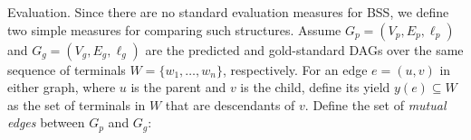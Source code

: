 \documentclass[11pt,letterpaper]{article}
\makeatletter
\renewcommand{\paragraph}{
  \@startsection{paragraph}{4}
  {\z@}{.3ex \@plus .3ex \@minus .2ex}{-1em}
  {\normalfont\normalsize\bfseries}
}
\makeatother
\begin{document}
\begin{table}
\caption{Statistics of the \textit{Wiki} and \textit{20K Leagues} UCCA corpora.
All counts exclude the root node.
}
\label{table:data}
\end{table}

\paragraph{Evaluation.}
Since there are no standard evaluation measures for BSS, we define
two simple measures for comparing such structures.
Assume $G_p=(V_p,E_p,\ell_p)$ and $G_g=(V_g,E_g,\ell_g)$
are the predicted and gold-standard DAGs over the same
sequence of terminals $W = \{w_1,\ldots,w_n\}$, respectively.
For an edge $e=(u,v)$ in either graph,
where $u$ is the parent and $v$ is the child, define its yield $y(e) \subseteq W$ as the
set of terminals in $W$ that are descendants of $v$.
Define the set of \textit{mutual edges} between $G_p$ and $G_g$:
\end{document}

